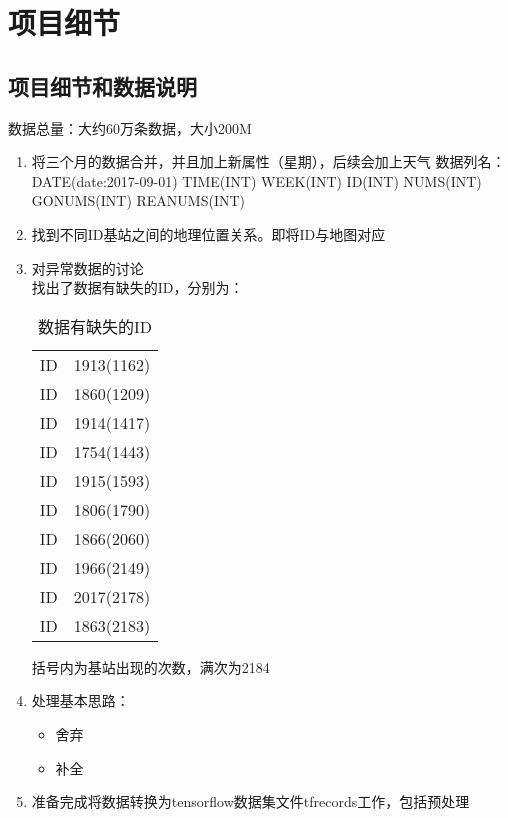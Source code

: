 
\chapter{项目细节} %
\label{AppendixA} %
\section{项目细节和数据说明}
数据总量：大约60万条数据，大小200M
\begin{enumerate}
	\item 将三个月的数据合并，并且加上新属性（星期），后续会加上天气
	数据列名：
	DATE(date:2017-09-01)	TIME(INT)		WEEK(INT)	ID(INT)	NUMS(INT)	GONUMS(INT)	REANUMS(INT)
	\item 找到不同ID基站之间的地理位置关系。即将ID与地图对应
	\item 对异常数据的讨论 \\
	找出了数据有缺失的ID，分别为：\\
	\begin{table}
	\label{tb:id}
	\centering
	\caption{数据有缺失的ID}
	\begin{tabular}{c|c}
	\hline
	\hline
	ID & 1913(1162) \\
	ID & 1860(1209) \\
	ID & 1914(1417) \\
	ID & 1754(1443) \\
	ID & 1915(1593) \\
	ID & 1806(1790) \\
	ID & 1866(2060) \\
	ID & 1966(2149) \\
	ID & 2017(2178) \\
	ID & 1863(2183) \\
	\hline
	\hline
	\end{tabular}
	\end{table}
	括号内为基站出现的次数，满次为2184
	\item 处理基本思路：
	\begin{itemize}
		\item 舍弃
		\item 补全
	\end{itemize}
	\item 准备完成将数据转换为tensorflow数据集文件tfrecords工作，包括预处理
\end{enumerate}
